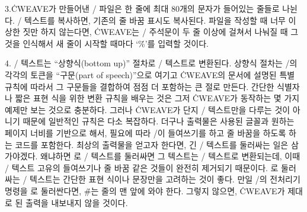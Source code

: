 3.\.{CWEAVE}가 만들어낸 \TEX/ 파일은 한 줄에 최대 80개의 문자가
들어있는 줄들로 나뉜다. \TEX/ 텍스트를 복사하면, 기존의 줄 바꿈 표시도
복사된다. 파일을 작성할 때 너무 이상한 짓만 하지 않는다면,
\.{CWEAVE}는 \TEX/ 주석문이 두 줄 이상에 걸쳐서 나눠질 때 그것을
인식해서 새 줄이 시작할 때마다 `\.\%'를 입력할 것이다.

4. \CEE/ 텍스트는 ``상향식(bottom up)'' 절차로 \TEX/ 텍스트로
변환된다. 상향식 절차는 \CEE/의 각각의 토큰을 ``구문(part of
speech)''으로 여기고 \.{CWEAVE}의 문서에 설명된 특별 규칙에 따라서 그
구문들을 결합하여 점점 더 포함하는 큰 절로 만든다. 
간단한 식별자나 짧은 표현 식을 위한 변환 규칙을 배우는 것은
그저 \.{CWEAVE}가 동작하는 몇 가지 예제만 보는 것으로
충분하다. 그러나 \.{CWEAVE}가 단지 \CEE/ 텍스트만을 다루는 것이 아니기
때문에 일반적인 규칙은 다소 복잡하다. 
더구나 출력물은 사용된 글꼴과 원하는 페이지 너비를 기반으로 해서,
필요에 따라 \TEX/이 들여쓰기를 하고 줄 바꿈을 하도록 하는 코드를 포함한다.
최상의 출력물을 얻고자 한다면, 긴 \CEE/ 텍스트를  둘러싸는 일은
삼가야겠다. 왜냐하면 \pb 로 \CEE/ 텍스트를 둘러싸면 그
텍스트는 \TEX/ 텍스트로 변환되는데, 이때 \CEE/ 텍스트 고유의
들여쓰기나 줄 바꿈 같은 것들이 완전히 제거되기 때문이다. \pb 로
둘러싸는 \CEE/ 텍스트는 간단한 표현 식이나 문장만을 고려하는 것이
좋다. 만일 \CEE/의 전처리기 명령을 \pb 로 둘러싼다면, \.\#는 줄의 맨
앞에 와야 한다. 그렇지 않으면, \.{CWEAVE}가 제대로 된 출력을 내보내지
않을 것이다.


